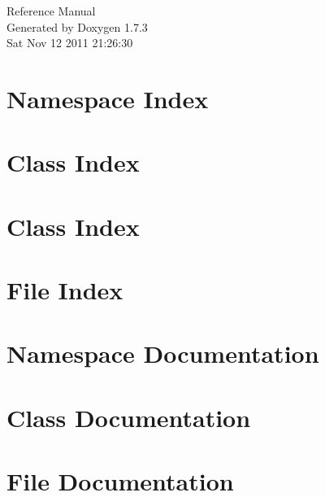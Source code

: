 \documentclass[a4paper]{book}
\begin{document}
\hypersetup{pageanchor=false}
\begin{titlepage}
\vspace*{7cm}
\begin{center}
{\Large Reference Manual}\\
\vspace*{1cm}
{\large Generated by Doxygen 1.7.3}\\
\vspace*{0.5cm}
{\small Sat Nov 12 2011 21:26:30}\\
\end{center}
\end{titlepage}
\clearemptydoublepage
{}
\tableofcontents
\clearemptydoublepage
{}
\hypersetup{pageanchor=true}
\chapter{Namespace Index}

\chapter{Class Index}

\chapter{Class Index}

\chapter{File Index}

\chapter{Namespace Documentation}

\chapter{Class Documentation}















\chapter{File Documentation}

















\printindex
\end{document}
